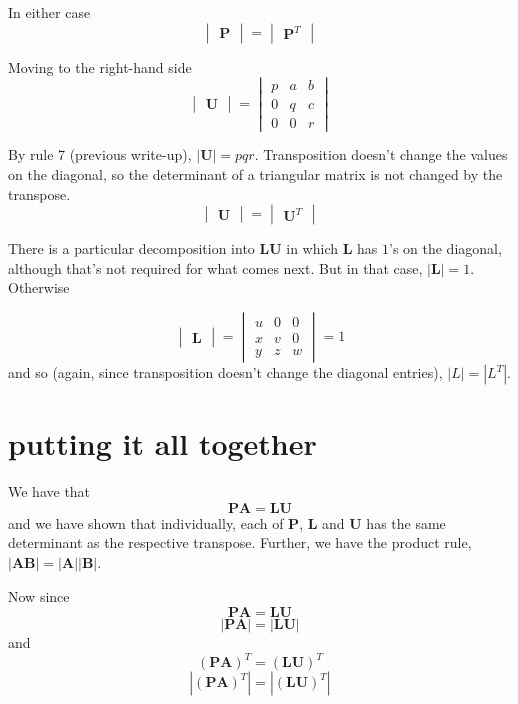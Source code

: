 \documentclass[11pt, oneside]{article}
\begin{document}
In either case
\[ \begin{vmatrix} \mathbf{P} \end{vmatrix} = 
\begin{vmatrix} \mathbf{P}^T \end{vmatrix}
\]

Moving to the right-hand side
\[
\begin{vmatrix} \mathbf{U} \end{vmatrix}
= 
\begin{vmatrix} p  &  a & b \\ 0  &  q & c \\ 0 & 0  &  r \end{vmatrix}
\]

By rule 7 (previous write-up), $|\mathbf{U}| = pqr$.  Transposition doesn't change the values on the diagonal, so the determinant of a triangular matrix is not changed by the transpose.
\[
\begin{vmatrix} \mathbf{U} \end{vmatrix}
=
\begin{vmatrix} \mathbf{U}^T \end{vmatrix}
\]

There is a particular decomposition into $\mathbf{LU}$ in which $\mathbf{L}$ has $1$'s on the diagonal, although that's not required for what comes next.  But in that case, $|\mathbf{L} | = 1$.  Otherwise

\[
\begin{vmatrix} \mathbf{L} \end{vmatrix} 
=
\begin{vmatrix} u  &  0 & 0 \\ x  &  v & 0 \\ y & z  &  w \end{vmatrix}
= 1
\]
and so (again, since transposition doesn't change the diagonal entries), $|L| = |L^T|$.

\section*{putting it all together}
We have that
\[ \mathbf{PA} =  \mathbf{LU} \]
and we have shown that individually, each of $\mathbf{P}$, $\mathbf{L}$ and $\mathbf{U}$ has the same determinant as the respective transpose.  Further, we have the product rule, $|\mathbf{AB}| = |\mathbf{A}| |\mathbf{B}|$.

Now since
\[ \mathbf{PA} =  \mathbf{LU} \]
\[ |\mathbf{PA}| =  |\mathbf{LU}| \]
and
\[ (\mathbf{PA})^T =  (\mathbf{LU})^T \]
\[ |(\mathbf{PA})^T| =  |(\mathbf{LU})^T| \]
\end{document}
